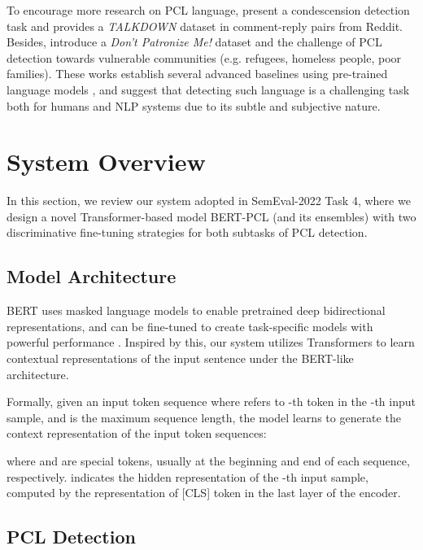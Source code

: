 \documentclass[11pt]{article}
\begin{document}
To encourage more research on PCL language, \citet{DBLP:conf/emnlp/WangP19} present a condescension detection task and provides a \textit{TALKDOWN} dataset in comment-reply pairs from Reddit. Besides, \citet{perez2020don} introduce a \textit{Don’t Patronize Me!} dataset and the challenge of PCL detection towards vulnerable communities (e.g. refugees, homeless people, poor families).
These works establish several advanced baselines using pre-trained language models \citep{DBLP:conf/naacl/DevlinCLT19,DBLP:journals/corr/abs-1907-11692}, and suggest that detecting such language is a challenging task both for humans and NLP systems due to its subtle and subjective nature.



\section{System Overview}




In this section, we review our system adopted in SemEval-2022 Task 4, where we design a novel Transformer-based model BERT-PCL (and its ensembles) with two discriminative fine-tuning strategies for both subtasks of PCL detection. 

\subsection{Model Architecture}
BERT \citep{DBLP:conf/naacl/DevlinCLT19} uses masked language models to enable pretrained deep bidirectional representations, and can be fine-tuned to create task-specific models with powerful performance \citep{DBLP:conf/pkdd/WeiHZTZWHH20,DBLP:conf/seke/HuW20}.
Inspired by this, our system utilizes Transformers \citep{vaswani2017attention} to learn contextual representations of the input sentence under the BERT-like architecture.


Formally, given an input token sequence
 where  refers to -th token in the -th input sample, and  is the maximum sequence length, the model learns to generate the context representation of the input token sequences: 

where  and  are special tokens, usually at the beginning and end of each sequence, respectively.
 indicates the hidden representation of the -th input sample, computed by the representation of [CLS] token in the last layer of the encoder. 


\subsection{PCL Detection}
\end{document}
